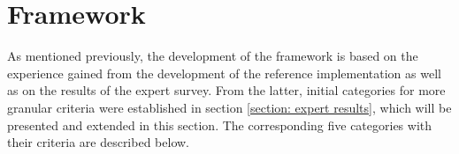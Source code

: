 	\section{Framework}
	
    As mentioned previously, the development of the framework is based on the experience gained from the development of the reference implementation as well as on the results of the expert survey. From the latter, initial categories for more granular criteria were established in section \ref{section: expert results}, which will be presented and extended in this section. The corresponding five categories with their criteria are described below.
    
